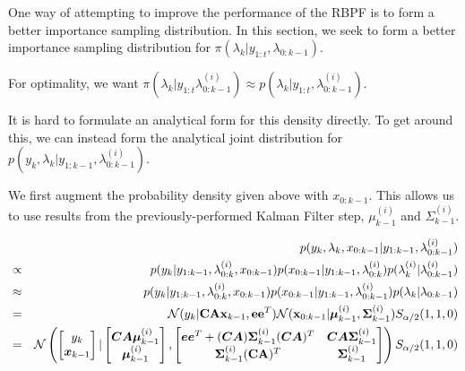 \documentclass[../main.tex]{subfiles}
\begin{document}
One way of attempting to improve the performance of the RBPF is to form a better importance sampling distribution. In this section, we seek to form a better importance sampling distribution for $\pi(\lambda_k | y_{1:t}, \lambda_{0:k-1})$.

For optimality, we want $\pi(\lambda_k | y_{1:t} \lambda_{0:k-1}^{(i)}) \approx p(\lambda_k | y_{1:t}, \lambda_{0:k-1}^{(i)})$.


It is hard to formulate an analytical form for this density directly. To get around this, we can instead form the analytical joint distribution for $p(y_k, \lambda_k | y_{1:k-1}, \lambda_{0:k-1}^{(i)})$. 

We first augment the probability density given above with $x_{0:k-1}$. This allows us to use results from the previously-performed Kalman Filter step, $\mu_{k-1}^{(i)}$ and $\Sigma_{k-1}^{(i)}$.

\begin{eqnarray}
& & p(y_k, \lambda_k, x_{0:k-1} | y_{1:k-1}, \lambda_{0:k-1}^{(i)}) \notag \\
& \propto & p(y_k | y_{1:k-1}, \lambda_{0:k}^{(i)}, x_{0:k-1}) p(x_{0:k-1} | y_{1:k-1}, \lambda_{0:k}^{(i)}) p(\lambda_k^{(i)} | \lambda_{0:k-1}^{(i)}) \notag \\
& \approx & p(y_k | y_{1:k-1}, \lambda_{0:k}^{(i)}, x_{0:k-1}) p(x_{0:k-1} | y_{1:k-1}, \lambda_{0:k-1}^{(i)}) p(\lambda_k | \lambda_{0:k-1}) \notag \\
& = & \mathcal{N} (y_k | \mathbf{CAx}_{k-1}, \mathbf{ee}^T) \mathcal{N} (\mathbf{x}_{0:k-1} | \bm{\mu}_{k-1}^{(i)}, \mathbf{\Sigma}_{k-1}^{(i)}) S_{\alpha/2}(1,1,0) \notag \\
& = & \mathcal{N} \left(
\begin{bmatrix} y_k \\ \bm{x}_{k-1}  \end{bmatrix} | 
\begin{bmatrix} \bm{CA\mu}_{k-1}^{(i)} \\ \bm{\mu}_{k-1}^{(i)}  \end{bmatrix},
\begin{bmatrix} \bm{ee}^T + (\bm{CA})\bm{\Sigma}_{k-1}^{(i)}(\bm{CA})^T & \bm{CA\Sigma}_{k-1}^{(i)} \\ {\bf \Sigma}_{k-1}^{(i)}({\bf CA})^T & {\bf \Sigma}_{k-1}^{(i)} \end{bmatrix} 
\right)  S_{\alpha/2}(1,1,0) \notag
\end{eqnarray}
\end{document}
